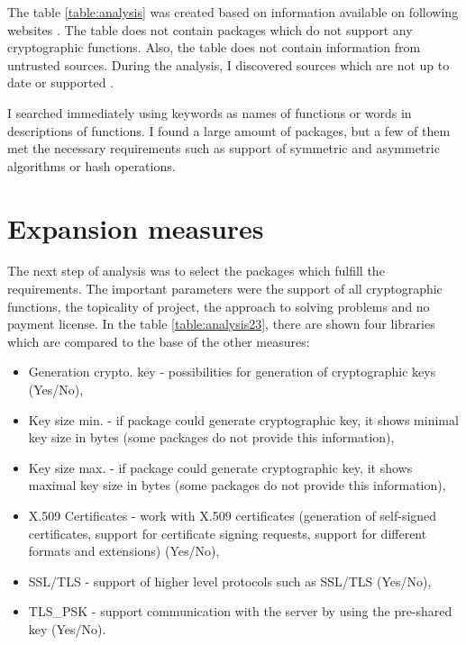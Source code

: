 \documentclass[
  digital, %
  notable,   %
  lof,     %
  lot,     %
]{fithesis3}
\begin{document}
The table \ref{table:analysis} was created based on information available on 
following websites \cite{security-golibrariesAndApps} \cite{cryptography-golibrariesAndApps} 
\cite{crypto-godoc} \cite{packages-thegoprogramminglanguage}. The 
table does not contain packages which do not support any cryptographic functions. Also, 
the table does not contain information from untrusted sources. During the analysis, I 
discovered sources which are not up to date or supported \cite{puregolibs}. 

I searched immediately using keywords as names of functions or words in descriptions of functions. 
I found a large amount of packages, but a few of them met the necessary requirements such as 
support of symmetric and asymmetric algorithms or hash operations. 

\section{Expansion measures}

The next step of analysis was to select the packages which fulfill the requirements. The important 
parameters were the support of all cryptographic functions, the topicality of project, the 
approach to solving problems and no payment license. In the table \ref{table:analysis23}, 
there are shown four libraries which are compared to the base of the other measures:
\vskip0.1in
\begin{itemize}[leftmargin=2em,rightmargin=1em,itemsep=0.75\parskip,parsep=0em,topsep=0em,partopsep=0em]
\item Generation crypto. key - possibilities for generation of cryptographic keys (Yes/No),
\item Key size min. - if package could generate cryptographic key, it shows minimal key size in bytes (some packages do not provide this information),
\item Key size max. - if package could generate cryptographic key, it shows maximal key size in bytes (some packages do not provide this information),
\item X.509 Certificates - work with X.509 certificates (generation of self-signed certificates, support for certificate signing requests, support for different formats and extensions) (Yes/No),
\item SSL/TLS - support of higher level protocols such as SSL/TLS (Yes/No),
\item TLS\_PSK - support communication with the server by using the pre-shared key (Yes/No).
\end{itemize}
\vskip0.1in
\end{document}
